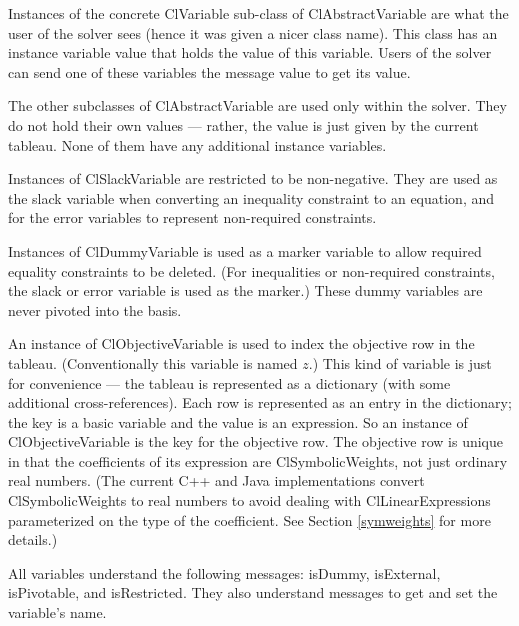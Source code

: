 \documentclass{article}
\begin{document}
Instances of the concrete {\sf ClVariable} sub-class of {\sf
  ClAbstractVariable} are what the user of the solver sees (hence
it was given a nicer class name).  This class has an instance variable
{\sf value} that holds the value of this variable.  Users of the solver can
send one of these variables the message {\sf value} to get its value.

The other subclasses of {\sf ClAbstractVariable} are used only within the
solver.  They do not hold their own values --- rather, the value is just
given by the current tableau.  None of them have any additional instance
variables.

Instances of {\sf ClSlackVariable} are restricted to be non-negative.  They
are used as the slack variable when converting an inequality constraint to
an equation, and for the error variables to represent non-required constraints.

Instances of {\sf ClDummyVariable} is used as a marker variable to allow
required equality constraints to be deleted.  (For inequalities or
non-required constraints, the slack or error variable is used as the
marker.)  These dummy variables are never pivoted into the basis.

An instance of {\sf ClObjectiveVariable} is used to index the objective row
in the tableau.  (Conventionally this variable is named $z$.)  This kind of
variable is just for convenience --- the tableau is represented as a
dictionary (with some additional cross-references).  Each row is
represented as an entry in the dictionary; the key is a basic variable and
the value is an expression.  So an instance of {\sf ClObjectiveVariable} is
the key for the objective row.  The objective row is unique in that the
coefficients of its expression are {\sf ClSymbolicWeight}s, not just
ordinary real numbers. (The current C++ and Java implementations convert {\sf
  ClSymbolicWeight}s to real numbers to avoid dealing with {\sf
  ClLinearExpression}s parameterized on the type of the coefficient.
See Section \ref{symweights} for more details.)

All variables understand the following messages: {\sf isDummy}, {\sf
isExternal}, {\sf isPivotable}, and {\sf isRestricted}.  They also
understand messages to get and set the variable's name.
\end{document}
